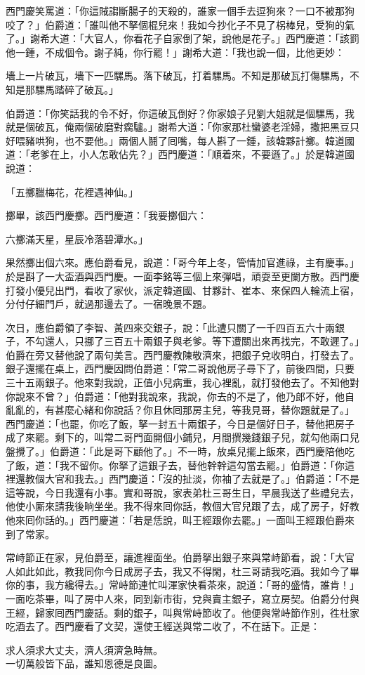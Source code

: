 西門慶笑罵道：「你這賊謅斷腸子的天殺的，誰家一個手去逗狗來？一口不被那狗咬了？」伯爵道：「誰叫他不拏個棍兒來！我如今抄化子不見了柺棒兒，受狗的氣了。」{}謝希大道：「大官人，你看花子自家倒了架，說他是花子。」西門慶道：「該罰他一鍾，不成個令。謝子純，你行罷！」謝希大道：「我也說一個，比他更妙：

\begin{myquote}
墻上一片破瓦，墻下一匹騾馬。落下破瓦，打着騾馬。不知是那破瓦打傷騾馬，不知是那騾馬踏碎了破瓦。」
\end{myquote}

伯爵道：「你笑話我的令不好，你這破瓦倒好？你家娘子兒劉大姐就是個騾馬，我就是個破瓦，俺兩個破磨對瘸驢。」謝希大道：「你家那杜蠻婆老淫婦，撒把黑豆只好喂豬哄狗，也不要他。」兩個人鬪了囘嘴，每人斟了一鍾，該韓夥計擲。韓道國道：「老爹在上，小人怎敢佔先？」西門慶道：「順着來，不要遜了。」於是韓道國說道：

\begin{myquote}
「五擲臘梅花，花裡遇神仙。」
\end{myquote}

擲畢，該西門慶擲。西門慶道：「我要擲個六：

\begin{myquote}
六擲滿天星，星辰冷落碧潭水。」
\end{myquote}

果然擲出個六來。應伯爵看見，說道：「哥今年上冬，管情加官進祿，主有慶事。」{}於是斟了一大盃酒與西門慶。一面李銘等三個上來彈唱，頑耍至更闌方散。西門慶打發小優兒出門，看收了家伙，派定韓道國、甘夥計、崔本、來保四人輪流上宿，分付仔細門戶，就過那邊去了。一宿晚景不題。

次日，應伯爵領了李智、黃四來交銀子，說：「此遭只關了一千四百五六十兩銀子，不勾還人，只挪了三百五十兩銀子與老爹。等下遭關出來再找完，不敢遲了。」伯爵在旁又替他說了兩句美言。西門慶教陳敬濟來，把銀子兌收明白，打發去了。銀子還擺在桌上，西門慶因問伯爵道：「常二哥說他房子尋下了，前後四間，只要三十五兩銀子。他來對我說，正值小兒病重，我心裡亂，就打發他去了。不知他對你說來不曾？」伯爵道：「他對我說來，我說，你去的不是了，他乃郎不好，他自亂亂的，有甚麼心緒和你說話？你且休囘那房主兒，等我見哥，替你題就是了。」西門慶道：「也罷，你吃了飯，拏一封五十兩銀子，今日是個好日子，替他把房子成了來罷。剩下的，叫常二哥門面開個小鋪兒，月間撰幾錢銀子兒，就勾他兩口兒盤攪了。」{}伯爵道：「此是哥下顧他了。」不一時，放桌兒擺上飯來，西門慶陪他吃了飯，道：「我不留你。你拏了這銀子去，替他幹幹這勾當去罷。」伯爵道：「你這裡還教個大官和我去。」西門慶道：「沒的扯淡，你袖了去就是了。」伯爵道：「不是這等說，今日我還有小事。實和哥說，家表弟杜三哥生日，早晨我送了些禮兒去，他使小厮來請我後晌坐坐。我不得來囘你話，教個大官兒跟了去，成了房子，好教他來囘你話的。」西門慶道：「若是恁說，叫王經跟你去罷。」一面叫王經跟伯爵來到了常家。

常峙節正在家，見伯爵至，讓進裡面坐。伯爵拏出銀子來與常峙節看，說：「大官人如此如此，教我同你今日成房子去，我又不得閑，杜三哥請我吃酒。我如今了畢你的事，我方纔得去。」常峙節連忙叫渾家快看茶來，說道：「哥的盛情，誰肯！」一面吃茶畢，叫了房中人來，同到新市街，兌與賣主銀子，寫立房契。伯爵分付與王經，歸家囘西門慶話。剩的銀子，叫與常峙節收了。他便與常峙節作別，徃杜家吃酒去了。西門慶看了文契，還使王經送與常二收了，不在話下。正是：

\begin{myquote}
求人須求大丈夫，濟人須濟急時無。\\一切萬般皆下品，誰知恩德是良圖。
\end{myquote}


